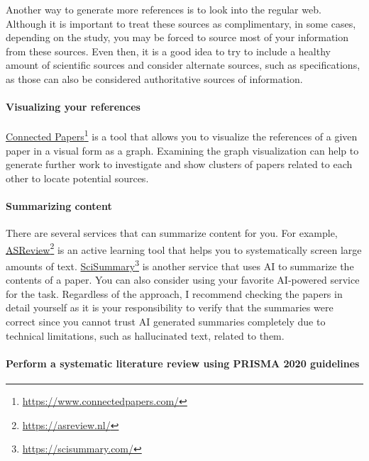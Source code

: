 Another way to generate more references is to look into the regular web.
Although it is important to treat these sources as complimentary, in some cases, depending on the study, you may be forced to source most of your information from these sources.
Even then, it is a good idea to try to include a healthy amount of scientific sources and consider alternate sources, such as specifications, as those can also be considered authoritative sources of information.

\paragraph{Visualizing your references}

\href{https://www.connectedpapers.com/}{Connected Papers}\footnote{\url{https://www.connectedpapers.com/}} is a tool that allows you to visualize the references of a given paper in a visual form as a graph.
Examining the graph visualization can help to generate further work to investigate and show clusters of papers related to each other to locate potential sources.

\paragraph{Summarizing content}

There are several services that can summarize content for you.
For example, \href{https://asreview.nl/}{ASReview}\footnote{\url{https://asreview.nl/}} is an active learning tool that helps you to systematically screen large amounts of text.
\href{https://scisummary.com/}{SciSummary}\footnote{\url{https://scisummary.com/}} is another service that uses AI to summarize the contents of a paper.
You can also consider using your favorite AI-powered service for the task.
Regardless of the approach, I recommend checking the papers in detail yourself as it is your responsibility to verify that the summaries were correct since you cannot trust AI generated summaries completely due to technical limitations, such as hallucinated text, related to them.


\paragraph{Perform a systematic literature review using PRISMA 2020 guidelines}

